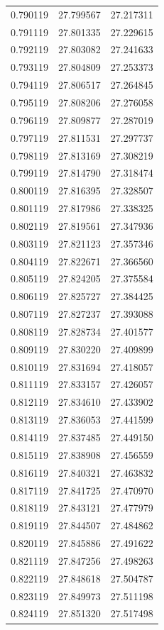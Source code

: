 \begin{tabular}{rrr}
0.790119 & 27.799567 & 27.217311 \\
0.791119 & 27.801335 & 27.229615 \\
0.792119 & 27.803082 & 27.241633 \\
0.793119 & 27.804809 & 27.253373 \\
0.794119 & 27.806517 & 27.264845 \\
0.795119 & 27.808206 & 27.276058 \\
0.796119 & 27.809877 & 27.287019 \\
0.797119 & 27.811531 & 27.297737 \\
0.798119 & 27.813169 & 27.308219 \\
0.799119 & 27.814790 & 27.318474 \\
0.800119 & 27.816395 & 27.328507 \\
0.801119 & 27.817986 & 27.338325 \\
0.802119 & 27.819561 & 27.347936 \\
0.803119 & 27.821123 & 27.357346 \\
0.804119 & 27.822671 & 27.366560 \\
0.805119 & 27.824205 & 27.375584 \\
0.806119 & 27.825727 & 27.384425 \\
0.807119 & 27.827237 & 27.393088 \\
0.808119 & 27.828734 & 27.401577 \\
0.809119 & 27.830220 & 27.409899 \\
0.810119 & 27.831694 & 27.418057 \\
0.811119 & 27.833157 & 27.426057 \\
0.812119 & 27.834610 & 27.433902 \\
0.813119 & 27.836053 & 27.441599 \\
0.814119 & 27.837485 & 27.449150 \\
0.815119 & 27.838908 & 27.456559 \\
0.816119 & 27.840321 & 27.463832 \\
0.817119 & 27.841725 & 27.470970 \\
0.818119 & 27.843121 & 27.477979 \\
0.819119 & 27.844507 & 27.484862 \\
0.820119 & 27.845886 & 27.491622 \\
0.821119 & 27.847256 & 27.498263 \\
0.822119 & 27.848618 & 27.504787 \\
0.823119 & 27.849973 & 27.511198 \\
0.824119 & 27.851320 & 27.517498 \\

\end{tabular}

